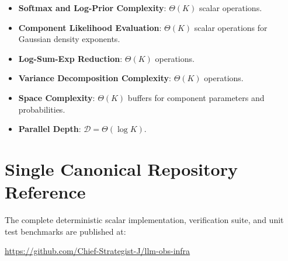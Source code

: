\documentclass[11pt,a4paper]{article}
\theoremstyle{definition}
\begin{document}
\begin{itemize}
    \item \textbf{Softmax and Log-Prior Complexity}: $\Theta(K)$ scalar operations.
    \item \textbf{Component Likelihood Evaluation}: $\Theta(K)$ scalar operations for Gaussian density exponents.
    \item \textbf{Log-Sum-Exp Reduction}: $\Theta(K)$ operations.
    \item \textbf{Variance Decomposition Complexity}: $\Theta(K)$ operations.
    \item \textbf{Space Complexity}: $\Theta(K)$ buffers for component parameters and probabilities.
    \item \textbf{Parallel Depth}: $\mathcal{D} = \Theta(\log K)$.
\end{itemize}

\section{Single Canonical Repository Reference}

The complete deterministic scalar implementation, verification suite, and unit test benchmarks are published at:
\begin{center}
\url{https://github.com/Chief-Strategist-J/llm-obs-infra}
\end{center}
\end{document}
